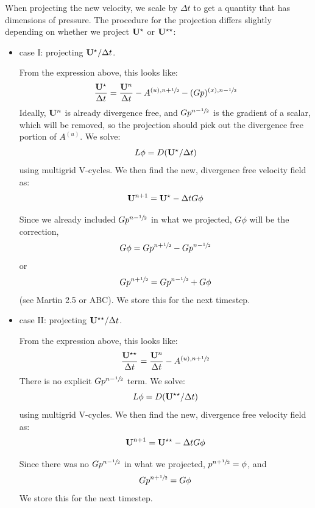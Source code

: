 When projecting the new velocity, we scale by $\Delta t$ to get a quantity
that has dimensions of pressure.  The procedure for the projection
differs slightly depending on whether we project ${\bf U}^\star$ or ${\bf U}^{\star\star}$:
\begin{itemize}
\item case I: projecting ${\bf U}^{\star}/\Delta t$.  

From the expression above,
this looks like:
\begin{equation}
\frac{{\bf U}^\star}{\Delta t} = \frac{{\bf U}^n}{\Delta t} - A^{(u),n+{\sfrac{1}{2}}} - (G p)^{(x),n-{\sfrac{1}{2}}}
\end{equation}
Ideally, ${\bf U}^n$ is already divergence free, and $Gp^{n-{\sfrac{1}{2}}}$ is the
gradient of a scalar, which will be removed, so the projection should
pick out the divergence free portion of $A^{(u)}$.  We solve:
\begin{equation}
L\phi = D ({\bf U}^\star/\Delta t)
\end{equation}
using multigrid V-cycles.
We then find the new, divergence free velocity field as:
\begin{equation}
{\bf U}^{n+1} = {\bf U}^\star - \Delta t G\phi
\end{equation}

Since we already included $Gp^{n-{\sfrac{1}{2}}}$ in what we projected, $G\phi$
will be the correction,
\begin{equation}
G\phi = Gp^{n+{\sfrac{1}{2}}} - Gp^{n-{\sfrac{1}{2}}}
\end{equation}
or
\begin{equation}
Gp^{n+{\sfrac{1}{2}}} = Gp^{n-{\sfrac{1}{2}}} + G\phi
\end{equation}
(see Martin 2.5 or ABC).  We store this for the next timestep.


\item case II: projecting ${\bf U}^{\star\star}/\Delta t$.  

From the expression above,
this looks like:
\begin{equation}
\frac{{\bf U}^{\star\star}}{\Delta t} = \frac{{\bf U}^n}{\Delta t} - A^{(u),n+{\sfrac{1}{2}}} 
\end{equation}
There is no explicit $Gp^{n-{\sfrac{1}{2}}}$ term.  We solve:
\begin{equation}
L\phi = D ({\bf U}^{\star\star}/\Delta t)
\end{equation}
using multigrid V-cycles.
We then find the new, divergence free velocity field as:
\begin{equation}
{\bf U}^{n+1} = {\bf U}^{\star\star} - \Delta t G\phi
\end{equation}

Since there was no $Gp^{n-{\sfrac{1}{2}}}$ in what we projected, $p^{n+{\sfrac{1}{2}}} = \phi$,
and 
\begin{equation}
Gp^{n+{\sfrac{1}{2}}} = G\phi
\end{equation}
We store this for the next timestep.
\end{itemize}

